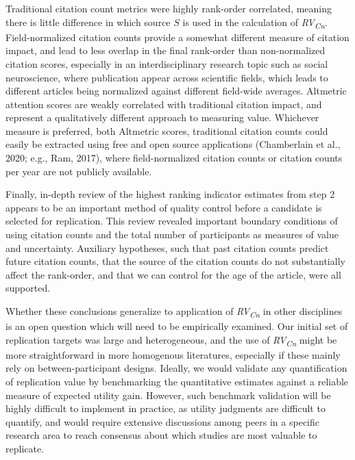 \documentclass[
  man,floatsintext]{apa6}
\begin{document}
Traditional citation count metrics were highly rank-order correlated, meaning there is little difference in which source \(S\) is used in the calculation of \emph{RV\textsubscript{Cn}}. Field-normalized citation counts provide a somewhat different measure of citation impact, and lead to less overlap in the final rank-order than non-normalized citation scores, especially in an interdisciplinary research topic such as social neuroscience, where publication appear across scientific fields, which leads to different articles being normalized against different field-wide averages. Altmetric attention scores are weakly correlated with traditional citation impact, and represent a qualitatively different approach to measuring value. Whichever measure is preferred, both Altmetric scores, traditional citation counts could easily be extracted using free and open source applications (Chamberlain et al., 2020; e.g., Ram, 2017), where field-normalized citation counts or citation counts per year are not publicly available.

Finally, in-depth review of the highest ranking indicator estimates from step 2 appears to be an important method of quality control before a candidate is selected for replication. This review revealed important boundary conditions of using citation counts and the total number of participants as measures of value and uncertainty. Auxiliary hypotheses, such that past citation counts predict future citation counts, that the source of the citation counts do not substantially affect the rank-order, and that we can control for the age of the article, were all supported.

Whether these conclusions generalize to application of \emph{RV\textsubscript{Cn}} in other disciplines is an open question which will need to be empirically examined. Our initial set of replication targets was large and heterogeneous, and the use of \emph{RV\textsubscript{Cn}} might be more straightforward in more homogenous literatures, especially if these mainly rely on between-participant designs. Ideally, we would validate any quantification of replication value by benchmarking the quantitative estimates against a reliable measure of expected utility gain. However, such benchmark validation will be highly difficult to implement in practice, as utility judgments are difficult to quantify, and would require extensive discussions among peers in a specific research area to reach consensus about which studies are most valuable to replicate.
\end{document}
